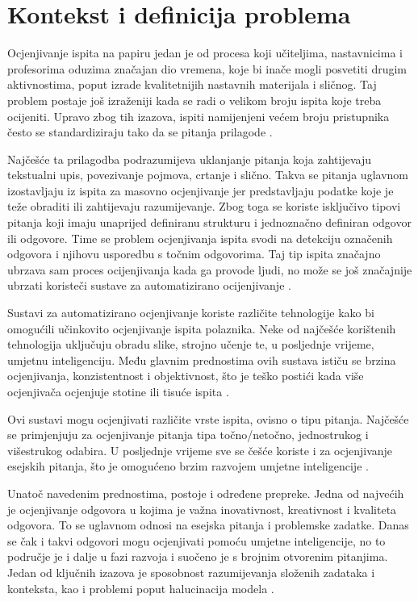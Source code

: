 \documentclass{foi}
\begin{document}
\section{Kontekst i definicija problema}

Ocjenjivanje ispita na papiru jedan je od procesa koji učiteljima, nastavnicima i profesorima oduzima značajan dio vremena, koje bi inače mogli posvetiti drugim aktivnostima, poput izrade kvalitetnijih nastavnih materijala i sličnog. Taj problem postaje još izraženiji kada se radi o velikom broju ispita koje treba ocijeniti. Upravo zbog tih izazova, ispiti namijenjeni većem broju pristupnika često se standardiziraju tako da se pitanja prilagode \cite{Bloomfield}.

Najčešće ta prilagodba podrazumijeva uklanjanje pitanja koja zahtijevaju tekstualni upis, povezivanje pojmova, crtanje i slično. Takva se pitanja uglavnom izostavljaju iz ispita za masovno ocjenjivanje jer predstavljaju podatke koje je teže obraditi ili zahtijevaju  razumijevanje. Zbog toga se koriste isključivo tipovi pitanja koji imaju unaprijed definiranu strukturu i jednoznačno definiran odgovor ili odgovore. Time se problem ocjenjivanja ispita svodi na detekciju označenih odgovora i njihovu usporedbu s točnim odgovorima. Taj tip ispita značajno ubrzava sam proces ocijenjivanja kada ga provode ljudi, no može se još značajnije ubrzati koristeči sustave za automatizirano ocijenjivanje \cite{sabbott2015Nov}.

Sustavi za automatizirano ocjenjivanje koriste različite tehnologije kako bi omogućili učinkovito ocjenjivanje ispita polaznika. Neke od najčešće korištenih tehnologija uključuju obradu slike, strojno učenje te, u posljednje vrijeme, umjetnu inteligenciju. Među glavnim prednostima ovih sustava ističu se brzina ocjenjivanja, konzistentnost i objektivnost, što je teško postići kada više ocjenjivača ocjenjuje stotine ili tisuće ispita \cite{Leonard2025Feb}.

Ovi sustavi mogu ocjenjivati različite vrste ispita, ovisno o tipu pitanja. Najčešće se primjenjuju za ocjenjivanje pitanja tipa točno/netočno, jednostrukog i višestrukog odabira. U posljednje vrijeme sve se češće koriste i za ocjenjivanje esejskih pitanja, što je omogućeno brzim razvojem umjetne inteligencije \cite{Leonard2025Feb}.

Unatoč navedenim prednostima, postoje i određene prepreke. Jedna od najvećih je ocjenjivanje odgovora u kojima je važna inovativnost, kreativnost i kvaliteta odgovora. To se uglavnom odnosi na esejska pitanja i problemske zadatke. Danas se čak i takvi odgovori mogu ocjenjivati pomoću umjetne inteligencije, no to područje je i dalje u fazi razvoja i suočeno je s brojnim otvorenim pitanjima. Jedan od ključnih izazova je sposobnost razumijevanja složenih zadataka i konteksta, kao i problemi poput halucinacija modela \cite{Leonard2025Feb}.
\end{document}
